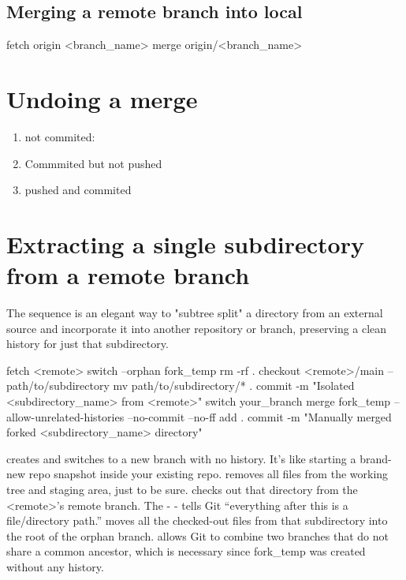 \subsection{Merging a remote branch into local}
\begin{gitBashBox}
fetch origin <branch_name>
merge origin/<branch_name>
\end{gitBashBox}

\section{Undoing a merge}
\begin{enumerate}
    \item not commited: 
    \item Commmited but not pushed 
    \item pushed and commited 
\end{enumerate}

\section{Extracting a single subdirectory from a remote branch}
The sequence is an elegant way to "subtree split" a directory from an external source and incorporate it into another repository or branch, preserving a clean history for just that subdirectory.

\begin{gitBashBox}
fetch <remote>
switch --orphan fork_temp
rm -rf .
checkout <remote>/main -- path/to/subdirectory
mv path/to/subdirectory/* .
commit -m "Isolated <subdirectory_name> from <remote>"
switch your_branch
merge fork_temp --allow-unrelated-histories --no-commit --no-ff
add .
commit -m "Manually merged forked <subdirectory_name> directory" 
\end{gitBashBox}

\noindent{} creates and switches to a new branch with no history. It's like starting a brand-new repo snapshot inside your existing repo.
\nln{} removes all files from the working tree and staging area, just to be sure.
\nln{} checks out that directory from the <remote>'s remote branch. The - - tells Git “everything after this is a file/directory path.”
\nln{} moves all the checked-out files from that subdirectory into the root of the orphan branch.
\nln{} allows Git to combine two branches that do not share a common ancestor, which is necessary since fork\_temp was created without any history.

